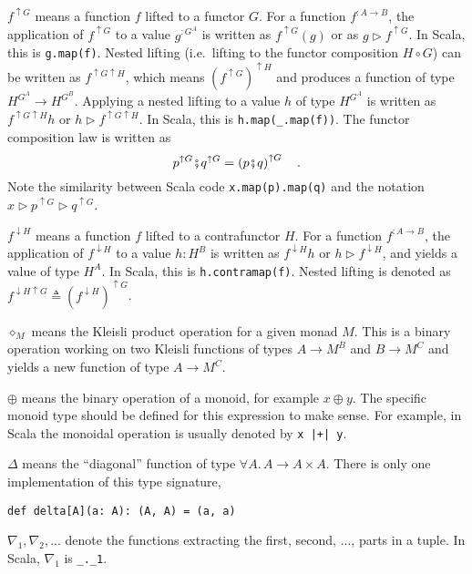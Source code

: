 $f^{\uparrow G}$ means a function $f$ lifted to a functor $G$.
For a function $f^{:A\rightarrow B}$, the application of $f^{\uparrow G}$
to a value $g^{:G^{A}}$ is written as $f^{\uparrow G}(g)$ or as
$g\triangleright f^{\uparrow G}$. In Scala, this is \lstinline!g.map(f)!.
Nested lifting (i.e.~lifting to the functor composition $H\circ G$)
can be written as $f^{\uparrow G\uparrow H}$, which means $\left(f^{\uparrow G}\right)^{\uparrow H}$
and produces a function of type $H^{G^{A}}\rightarrow H^{G^{B}}$.
Applying a nested lifting to a value $h$ of type $H^{G^{A}}$ is
written as $f^{\uparrow G\uparrow H}h$ or $h\triangleright f^{\uparrow G\uparrow H}$.
In Scala, this is \lstinline!h.map(_.map(f))!. The functor composition
law is written as
\[
p^{\uparrow G}\bef q^{\uparrow G}=\left(p\bef q\right)^{\uparrow G}\quad.
\]
Note the similarity between Scala code \lstinline!x.map(p).map(q)!
and the notation $x\triangleright p^{\uparrow G}\triangleright q^{\uparrow G}$.

$f^{\downarrow H}$ means a function $f$ lifted to a contrafunctor
$H$. For a function $f^{:A\rightarrow B}$, the application of $f^{\downarrow H}$
to a value $h:H^{B}$ is written as $f^{\downarrow H}h$ or $h\triangleright f^{\downarrow H}$,
and yields a value of type $H^{A}$. In Scala, this is \lstinline!h.contramap(f)!.
Nested lifting is denoted as $f^{\downarrow H\uparrow G}\triangleq(f^{\downarrow H})^{\uparrow G}$.

$\diamond_{M}$ means the Kleisli product operation for a given monad
$M$. This is a binary operation working on two Kleisli functions
of types $A\rightarrow M^{B}$ and $B\rightarrow M^{C}$ and yields
a new function of type $A\rightarrow M^{C}$.

$\oplus$ means the binary operation of a monoid, for example $x\oplus y$.
The specific monoid type should be defined for this expression to
make sense. For example, in Scala the monoidal operation is usually
denoted by \lstinline!x |+| y!.

$\Delta$ means the \textsf{``}diagonal\textsf{''} function of type $\forall A.\,A\rightarrow A\times A$.
There is only one implementation of this type signature,
\begin{lstlisting}
def delta[A](a: A): (A, A) = (a, a)
\end{lstlisting}

$\nabla_{1},\nabla_{2},...$ denote the functions extracting the first,
second, ..., parts in a tuple. In Scala, $\nabla_{1}$ is \lstinline!_._1!.

